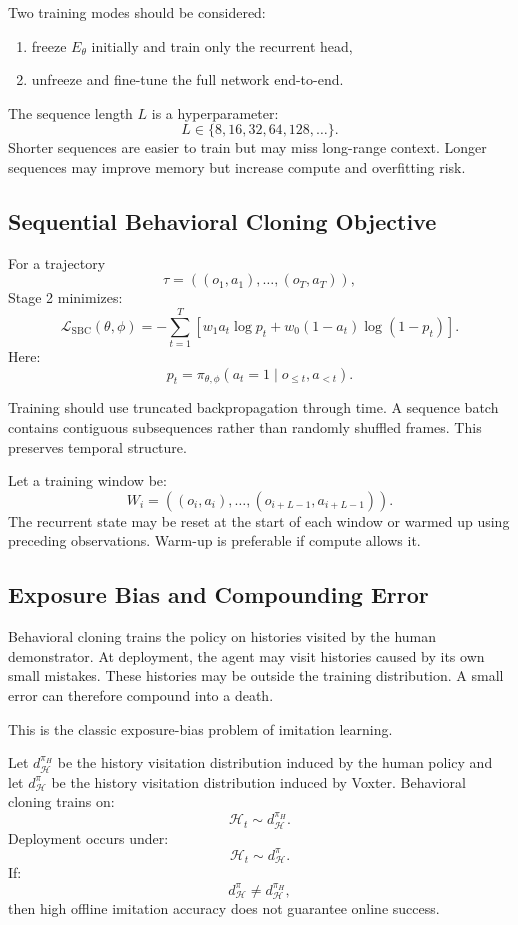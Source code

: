 \documentclass[11pt]{article}
\newcommand{\hist}{\mathcal{H}}
\newcommand{\dhist}[1]{d_{\mathcal{H}}^{#1}}
\begin{document}
Two training modes should be considered:
\begin{enumerate}
  \item freeze \(E_\theta\) initially and train only the recurrent head,
  \item unfreeze and fine-tune the full network end-to-end.
\end{enumerate}

The sequence length \(L\) is a hyperparameter:
\[
  L \in \{8,16,32,64,128,\ldots\}.
\]
Shorter sequences are easier to train but may miss long-range context. Longer sequences may improve memory but increase compute and overfitting risk.

\subsection{Sequential Behavioral Cloning Objective}

For a trajectory
\[
  \tau = ((o_1,a_1),\ldots,(o_T,a_T)),
\]
Stage 2 minimizes:
\[
  \mathcal{L}_{\mathrm{SBC}}(\theta,\phi)
  =
  -\sum_{t=1}^{T}
  \left[
    w_1 a_t \log p_t
    +
    w_0(1-a_t)\log(1-p_t)
  \right].
\]
Here:
\[
  p_t = \pi_{\theta,\phi}(a_t=1 \mid o_{\le t},a_{<t}).
\]

Training should use truncated backpropagation through time. A sequence batch contains contiguous subsequences rather than randomly shuffled frames. This preserves temporal structure.

Let a training window be:
\[
  W_i = ((o_i,a_i),\ldots,(o_{i+L-1},a_{i+L-1})).
\]
The recurrent state may be reset at the start of each window or warmed up using preceding observations. Warm-up is preferable if compute allows it.

\subsection{Exposure Bias and Compounding Error}

Behavioral cloning trains the policy on histories visited by the human demonstrator. At deployment, the agent may visit histories caused by its own small mistakes. These histories may be outside the training distribution. A small error can therefore compound into a death.

This is the classic exposure-bias problem of imitation learning.

Let \(\dhist{\pi_H}\) be the history visitation distribution induced by the human policy and let \(\dhist{\pi}\) be the history visitation distribution induced by Voxter. Behavioral cloning trains on:
\[
  \hist_t \sim \dhist{\pi_H}.
\]
Deployment occurs under:
\[
  \hist_t \sim \dhist{\pi}.
\]
If:
\[
  \dhist{\pi} \ne \dhist{\pi_H},
\]
then high offline imitation accuracy does not guarantee online success.
\end{document}
